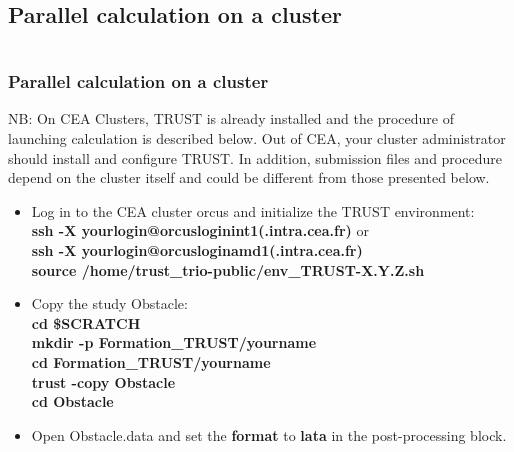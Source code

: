 \documentclass[10pt, hyperref={unicode=true,pdfusetitle, bookmarks=true,bookmarksnumbered=false,bookmarksopen=false, breaklinks=false,pdfborder={0 0 1},backref=true,colorlinks=true,linkcolor=darkblue,pageanchor}]{beamer}
\begin{document}
\subsection{Parallel calculation on a cluster} \label{exo_para_3}
\begin{frame}
\begin{small}
\begin{columns}[c] 
\tableofcontents[sections={1-9},currentsection, currentsubsection]
\tableofcontents[sections={10-16},currentsection, currentsubsection]
\end{columns}
\end{small}
\end{frame}
\begin{frame}
\frametitle{Parallel calculation on a cluster}
\begin{block}{}
NB: On CEA Clusters, TRUST is already installed and the procedure of launching calculation is described below. Out of CEA, your cluster administrator should install and configure TRUST. In addition, submission files and procedure depend on the cluster itself and could be different from those presented below.
\begin{itemize}
\item Log in to the CEA cluster orcus and initialize the TRUST environment: \\
{\small{
\textbf{ssh -X yourlogin@orcusloginint1(.intra.cea.fr)} or\\
\textbf{ssh -X yourlogin@orcusloginamd1(.intra.cea.fr)} \\
\textbf{source /home/trust\_trio-public/env\_TRUST-X.Y.Z.sh}\\
}}

\item Copy the study Obstacle:\\
\textbf{cd \$SCRATCH}\\
\textbf{mkdir  -p  Formation\_TRUST/yourname} \\
\textbf{cd Formation\_TRUST/yourname} \\
\textbf{trust -copy Obstacle} \\
\textbf{cd Obstacle} \\

\item Open Obstacle.data and set the \textbf{format} to \textbf{lata} in the post-processing block.

\end{itemize}

\end{block}
\end{frame}
\end{document}

